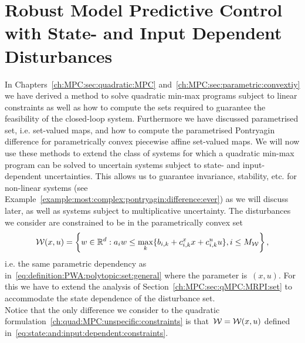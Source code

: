 \resetcounters
\chapter{Robust Model Predictive Control with State- and Input Dependent Disturbances}\label{ch:MPC:sec:state:input:disturbances}
%
%
%
%
In Chapters~\ref{ch:MPC:sec:quadratic:MPC} and~\ref{ch:MPC:sec:parametric:convextiy} we have derived a method to solve quadratic min-max programs subject to linear constraints as well as how to compute the sets required to guarantee the feasibility of the closed-loop system.
%
Furthermore we have discussed parametrised set, i.e. set-valued maps, and how to compute the parametrised Pontryagin difference for parametrically convex piecewise affine set-valued maps. 
%
We will now use these methods to extend the class of systems for which a quadratic min-max program can be solved to uncertain systems subject to state- and input-dependent uncertainties.
%
This allows us to guarantee invariance, stability, etc. for non-linear systems (see Example~\ref{example:most:complex:pontryagin:difference:ever}) as we will discuss later, as well as systems subject to multiplicative uncertainty.
%
The disturbances we consider are constrained to be in the parametrically convex set
%
\begin{equation}\label{eq:state:and:input:dependent:constraints}
	\mathcal W(x,u) = \left\{w\in\mathbb R^d:a_i w\leq \max_k\{b_{i,k}+c_{i,k}^x x+c_{i,k}^u u\},i\leq M_{\mathcal W}\right\},
\end{equation}
%
i.e. the same parametric dependency as in~\eqref{eq:definition:PWA:polytopic:set:general} where the parameter is~$(x,u)$.
%
For this we have to extend the analysis of Section~\ref{ch:MPC:sec:qMPC:MRPI:set} to accommodate the state dependence of the disturbance set.
%
\\[1em]
%
Notice that the only difference we consider to the quadratic formulation~\eqref{ch:quad:MPC:unspecific:constraints} is that~$\mathcal W=\mathcal W(x,u)$ defined in~\eqref{eq:state:and:input:dependent:constraints}.
%
